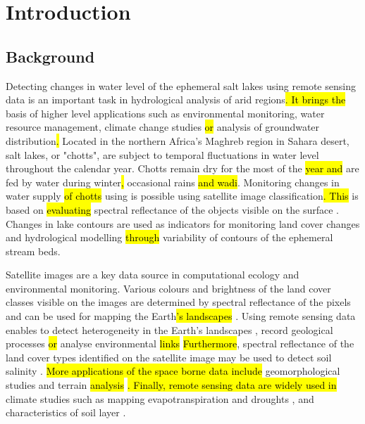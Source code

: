 \documentclass[asi,article,submit,pdftex,moreauthors]{Definitions/mdpi}
\begin{document}
\section{Introduction}

\subsection{Background}
Detecting changes in water level of the ephemeral salt lakes using remote sensing data is an important task in hydrological analysis of arid regions\hl{. It brings the} basis of higher level applications\hl{ }such as environmental monitoring, water resource management, climate change studies \hl{or} analysis of groundwater distribution\hl{. }Located in the northern Africa's Maghreb region in Sahara desert, salt lakes, or "chotts", are subject to temporal fluctuations in water level throughout the calendar year. Chotts remain dry for the most of the \hl{year and} are fed by water\hl{ }during winter\hl{, }occasional rains \hl{and wadi}. Monitoring\hl{ }changes in water supply \hl{of chotts }using\hl{ }is possible using satellite image classification\hl{. This} is based on \hl{evaluating }spectral reflectance of the objects visible on the\hl{ }surface \cite{Medjani}. Changes in lake contours are used as indicators for monitoring land cover changes and hydrological modelling \hl{through }variability of contours of the ephemeral stream beds.

Satellite images are a key data source in computational ecology and environmental monitoring. Various colours and brightness of the land cover classes visible on the images are determined by\hl{ }spectral reflectance of the pixels and can be used for mapping the\hl{ }Earth\hl{'s landscapes} \cite{Takorabt,Laghouag,Lemenkova202021,Lemenkova202205,Amri}. Using remote sensing data enables to detect heterogeneity in the Earth's landscapes \cite{Abbas}, record geological processes  \cite{ARAIBIA2022104455,LAMRI2016143} \hl{or} analyse environmental \hl{links} \cite{Deroin2019,data7060074} \hl{Furthermore}, spectral reflectance of the land cover types identified on the satellite image may be used to detect soil salinity \cite{abdennour2019detection}. \hl{More applications of the space borne data include} geomorphological studies and\hl{ }terrain \hl{analysis} \cite{Rebillard,Lemenkova202127,Lemenkova202105}\hl{. Finally, remote sensing data are widely used in} climate studies such as mapping evapotranspiration and droughts \cite{ijgi11090473}, and characteristics of soil layer \cite{MULDER20111}.  
\end{document}
